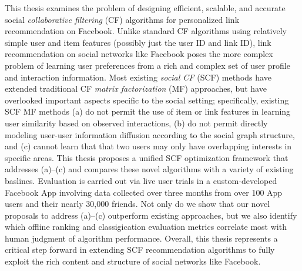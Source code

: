 This thesis examines the problem of designing efficient, scalable, and
accurate social \emph{collaborative filtering} (CF) algorithms for
personalized link recommendation on Facebook.  Unlike standard CF
algorithms using relatively simple user and item features (possibly
just the user ID and link ID), link recommendation on social networks
like Facebook poses the more complex problem of learning user
preferences from a rich and complex set of user profile and
interaction information.  Most existing \emph{social CF} (SCF) methods
have extended traditional CF \emph{matrix factorization} (MF)
approaches, but have overlooked important aspects specific to the
social setting; specifically, existing SCF MF methods (a) do not
permit the use of item or link features in learning user similarity
based on observed interactions, (b) do not permit directly modeling
user-user information diffusion according to the social graph
structure, and (c) cannot learn that that two users may only have
overlapping interests in specific areas.  
This thesis proposes a unified SCF optimization framework that
addresses (a)--(c) and compares these novel algorithms with a variety
of existing baslines.  Evaluation is carried out via live user trials
in a custom-developed Facebook App involving data collected over three
months from over 100 App users and their nearly 30,000 friends.  Not
only do we show that our novel proposals to address (a)--(c)
outperform existing approaches, but we also identify which offline
ranking and classigication evaluation metrics correlate most with
human judgment of algorithm performance.  Overall, this thesis
represents a critical step forward in extending SCF recommendation
algorithms to fully exploit the rich content and structure of social
networks like Facebook.